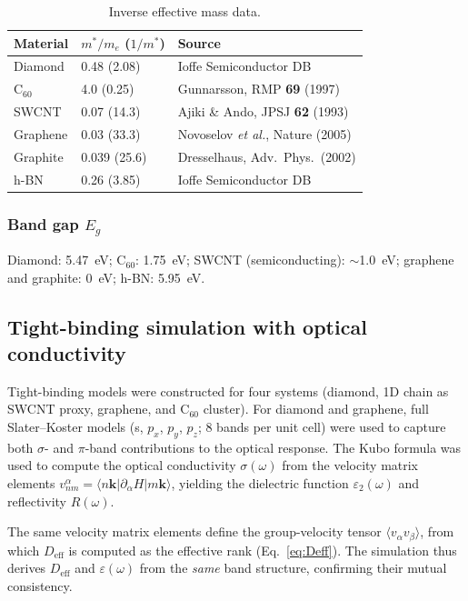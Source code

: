 \documentclass[twocolumn,showpacs,preprintnumbers,amsmath,amssymb,prb]{revtex4-2}
\begin{document}
\begin{table}[h]
\caption{Inverse effective mass data.}
\label{tab:invmass}
\begin{ruledtabular}
\begin{tabular}{lll}
  Material & $m^*/m_e$ ($1/m^*$) & Source \\
  \hline
  Diamond & 0.48 (2.08) & Ioffe Semiconductor DB \\
  C$_{60}$ & 4.0 (0.25) & Gunnarsson, RMP \textbf{69} (1997) \\
  SWCNT & 0.07 (14.3) & Ajiki \& Ando, JPSJ \textbf{62} (1993) \\
  Graphene & 0.03 (33.3) & Novoselov \textit{et al.}, Nature (2005) \\
  Graphite & 0.039 (25.6) & Dresselhaus, Adv.\ Phys.\ (2002) \\
  h-BN & 0.26 (3.85) & Ioffe Semiconductor DB \\
\end{tabular}
\end{ruledtabular}
\end{table}

\subsubsection{Band gap $E_g$}

Diamond: 5.47~eV; C$_{60}$: 1.75~eV; SWCNT (semiconducting): $\sim$1.0~eV;
graphene and graphite: 0~eV; h-BN: 5.95~eV.

\subsection{Tight-binding simulation with optical conductivity}

Tight-binding models were constructed for four systems (diamond,
1D chain as SWCNT proxy, graphene, and C$_{60}$ cluster).
For diamond and graphene, full Slater--Koster models (s, $p_x$, $p_y$,
$p_z$; 8 bands per unit cell) were used to capture both $\sigma$- and
$\pi$-band contributions to the optical response.
The Kubo formula was used to compute the optical conductivity
$\sigma(\omega)$ from the velocity matrix elements
$v_{nm}^\alpha = \langle n\bm{k} | \partial_\alpha H | m\bm{k} \rangle$,
yielding the dielectric function $\varepsilon_2(\omega)$ and
reflectivity $R(\omega)$.

The same velocity matrix elements define the group-velocity tensor
$\langle v_\alpha v_\beta \rangle$, from which $D_\mathrm{eff}$ is
computed as the effective rank (Eq.~\ref{eq:Deff}). The simulation
thus derives $D_\mathrm{eff}$ and $\varepsilon(\omega)$ from the
\emph{same} band structure, confirming their mutual consistency.
\end{document}
